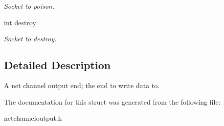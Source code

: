 \begin{DoxyCompactItemize}
\begin{DoxyCompactList}\small\item\em Socket to poison. \end{DoxyCompactList}\item 
\hypertarget{structnetChannelOutput_a4f58d0070963e894773977ebec5a2d58}{int \hyperlink{structnetChannelOutput_a4f58d0070963e894773977ebec5a2d58}{destroy}}\label{structnetChannelOutput_a4f58d0070963e894773977ebec5a2d58}

\begin{DoxyCompactList}\small\item\em Socket to destroy. \end{DoxyCompactList}\end{DoxyCompactItemize}


\subsection{Detailed Description}
A net channel output end; the end to write data to. 

The documentation for this struct was generated from the following file\-:\begin{DoxyCompactItemize}
\item 
netchanneloutput.\-h\end{DoxyCompactItemize}
